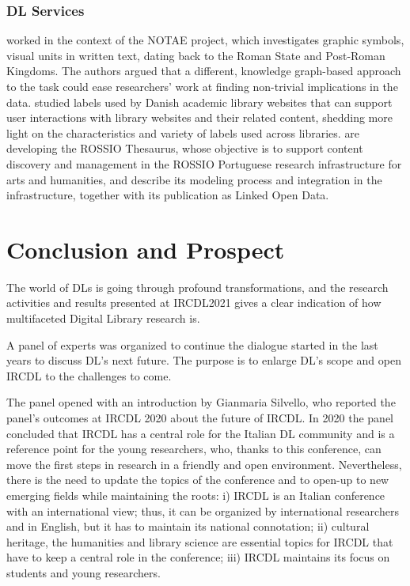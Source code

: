 \documentclass[sigconf, nonacm]{acmart}
\begin{document}
\subsubsection*{DL Services}
\citet{BernasconiBCCGL21} worked in the context of the NOTAE project, which investigates graphic symbols, visual units in written text, dating back to the Roman State and Post-Roman Kingdoms. The authors argued that a different, knowledge graph-based approach to the task could ease researchers' work at finding non-trivial implications in the data. 
\citet{Svarre21} studied labels used by Danish academic library websites that can support user interactions with library websites and their related content, shedding more light on the characteristics and variety of labels used across libraries. 
\citet{AlmeidaFM21} are developing the ROSSIO Thesaurus, whose objective is to support content discovery and management in the ROSSIO Portuguese research infrastructure for arts and humanities, and describe its modeling process and integration in the infrastructure, together with its publication as Linked Open Data.


\section{Conclusion and Prospect}
The world of DLs is going through profound transformations,
and the research activities and results presented at
IRCDL2021 gives a clear indication of how multifaceted Digital Library research is.

A panel of experts was organized to continue the dialogue started in the last years to discuss DL's next future. The purpose is to enlarge DL's scope and open IRCDL to the challenges to come.

The panel opened with an introduction by Gianmaria Silvello, who reported the panel's outcomes at IRCDL 2020 about the future of IRCDL. In 2020 the panel concluded that IRCDL has a central role for the Italian DL community and is a reference point for the young researchers, who, thanks to this conference, can move the first steps in research in a friendly and open environment. Nevertheless, there is the need to update the topics of the conference and to open-up to new emerging fields while maintaining the roots: i) IRCDL is an Italian conference with an international view; thus, it can be organized by international researchers and in English, but it has to maintain its national connotation; ii) cultural heritage, the humanities and library science are essential topics for IRCDL that have to keep a central role in the conference; iii) IRCDL maintains its focus on students and young researchers. 
\end{document}
